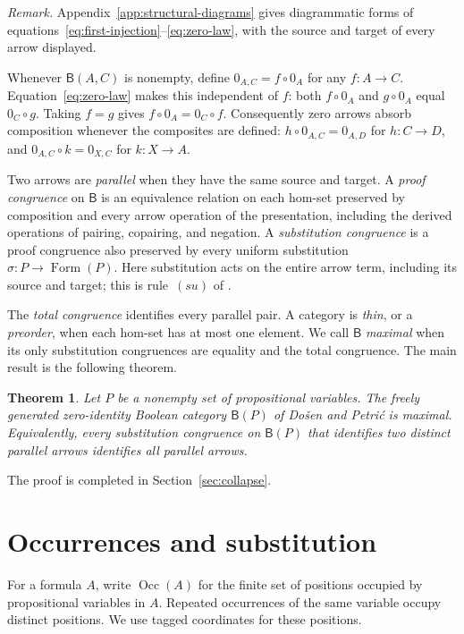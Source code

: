 \documentclass[11pt]{article}
\newtheorem{theorem}{Theorem}[section]
\newcommand{\B}{\mathsf B}
\newcommand{\Occ}{\operatorname{Occ}}
\newcommand{\FormulaSet}{\operatorname{Form}}
\begin{document}
\noindent\textit{Remark.}
Appendix~\ref{app:structural-diagrams} gives diagrammatic forms of
equations~\eqref{eq:first-injection}--\eqref{eq:zero-law}, with the
source and target of every arrow displayed.

Whenever $\B(A,C)$ is nonempty, define $0_{A,C}=f\circ0_A$ for any
$f:A\to C$. Equation~\eqref{eq:zero-law} makes this independent of
$f$: both $f\circ0_A$ and $g\circ0_A$ equal $0_C\circ g$.
Taking $f=g$ gives $f\circ0_A=0_C\circ f$. Consequently zero arrows
absorb composition whenever the composites are defined:
$h\circ0_{A,C}=0_{A,D}$ for $h:C\to D$, and
$0_{A,C}\circ k=0_{X,C}$ for $k:X\to A$.

Two arrows are \emph{parallel} when they have the same source and
target. A \emph{proof congruence} on $\B$ is an equivalence relation
on each hom-set preserved by composition and every arrow operation
of the presentation, including the derived operations of pairing,
copairing, and negation.
A \emph{substitution congruence} is a proof congruence also preserved
by every uniform substitution $\sigma:P\to\FormulaSet(P)$.
Here substitution acts on the entire arrow term, including its source
and target; this is rule~$(su)$ of \cite[\S2.7, p.~51]{DP}.

The \emph{total congruence} identifies every parallel pair. A category
is \emph{thin}, or a \emph{preorder}, when each hom-set has at most one
element. We call $\B$ \emph{maximal} when its only substitution
congruences are equality and the total congruence. The main result is
the following theorem.

\begin{theorem}\label{thm:main}
Let $P$ be a nonempty set of propositional variables. The freely
generated zero-identity Boolean category $\B(P)$ of Do\v{s}en and
Petri\'c is maximal. Equivalently, every substitution congruence on
$\B(P)$ that identifies two distinct parallel arrows identifies all
parallel arrows.
\end{theorem}

The proof is completed in Section~\ref{sec:collapse}.

\section{Occurrences and substitution}\label{sec:occurrences}

For a formula $A$, write $\Occ(A)$ for the finite set of positions
occupied by propositional variables in $A$. Repeated occurrences of the
same variable occupy distinct positions. We use tagged coordinates for
these positions.
\end{document}

